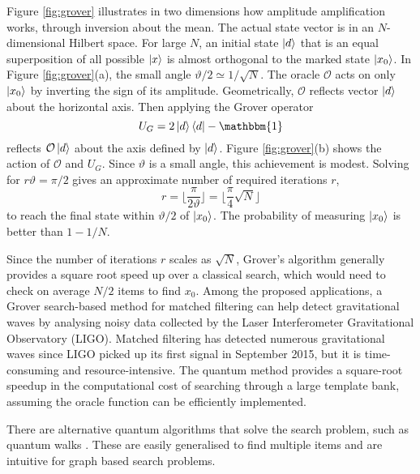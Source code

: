 \documentclass[10pt]{iopart}
\begin{document}
Figure \ref{fig:grover} illustrates in two dimensions how amplitude amplification works, through inversion about the mean.  The actual state vector is in an $N$-dimensional Hilbert space.  For large $N$, an initial state $\ket{d}$ that is an equal superposition of all possible $\ket{x}$ is almost orthogonal to the marked state $\ket{x_0}$. In Figure \ref{fig:grover}(a), the small angle $\vartheta/2\simeq 1/\sqrt{N}$.  The oracle $\mathcal{O}$ acts on only $\ket{x_0}$ by inverting the sign of its amplitude. Geometrically, $\mathcal{O}$ reflects vector $\ket{d}$ about the horizontal axis. Then applying the Grover operator
\begin{equation}
U_G = 2 \ket{d} \bra{d} - \mathbbm{1}
\end{equation}
reflects $\mathcal{O}\ket{d}$ about the axis defined by $\ket{d}$. Figure \ref{fig:grover}(b) shows the action of $\mathcal{O}$ and $U_G$.  Since $\vartheta$ is a small angle, this achievement is modest. Solving for $r\vartheta = \pi/2$ gives an approximate number of required iterations $r$,
\begin{equation}
r = 
\Big\lfloor \frac{\pi}{2\vartheta} \Big\rfloor 
=
\Big\lfloor \frac{\pi}{4} \sqrt{N} \Big\rfloor
\end{equation}
to reach the final state within $\vartheta/2$ of $\ket{x_0}$. The probability of measuring $\ket{x_0}$ is better than $1-1/N$.

Since the number of iterations $r$ scales as $\sqrt{N}$, Grover's algorithm generally provides a square root speed up over a classical search, which would need to check on average $N/2$ items to find $x_0$. Among the proposed applications, a Grover search-based method for matched filtering can help detect gravitational waves \cite{Gao2022} by analysing noisy data collected by the Laser Interferometer Gravitational Observatory (LIGO). Matched filtering has detected numerous gravitational waves since LIGO picked up its first signal in September 2015, but it is time-consuming and resource-intensive. The quantum method provides a square-root speedup in the computational cost of searching through a large template bank, assuming the oracle function can be efficiently implemented.

There are alternative quantum algorithms that solve the search problem, such as quantum walks \cite{Shenvi2002}. These are easily generalised to find multiple items \cite{Childs2003} and are intuitive for graph based search problems.


\end{document}

